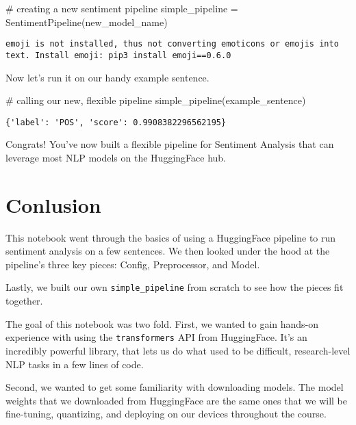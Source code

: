 \documentclass[
  letterpaper,
  DIV=11,
  numbers=noendperiod]{scrartcl}
\newenvironment{Shaded}{\begin{snugshade}}{\end{snugshade}}
\newcommand{\CommentTok}[1]{\textcolor[rgb]{0.37,0.37,0.37}{#1}}
\newcommand{\NormalTok}[1]{\textcolor[rgb]{0.00,0.23,0.31}{#1}}
\newcommand{\OperatorTok}[1]{\textcolor[rgb]{0.37,0.37,0.37}{#1}}
\begin{document}
\begin{Shaded}
\begin{Highlighting}[]
\CommentTok{\# creating a new sentiment pipeline}
\NormalTok{simple\_pipeline }\OperatorTok{=}\NormalTok{ SentimentPipeline(new\_model\_name)}
\end{Highlighting}
\end{Shaded}

\begin{verbatim}
emoji is not installed, thus not converting emoticons or emojis into text. Install emoji: pip3 install emoji==0.6.0
\end{verbatim}

Now let's run it on our handy example sentence.

\begin{Shaded}
\begin{Highlighting}[]
\CommentTok{\# calling our new, flexible pipeline}
\NormalTok{simple\_pipeline(example\_sentence)}
\end{Highlighting}
\end{Shaded}

\begin{verbatim}
{'label': 'POS', 'score': 0.9908382296562195}
\end{verbatim}

Congrats! You've now built a flexible pipeline for Sentiment Analysis
that can leverage most NLP models on the HuggingFace hub.

\section{Conlusion}\label{conlusion}

This notebook went through the basics of using a HuggingFace pipeline to
run sentiment analysis on a few sentences. We then looked under the hood
at the pipeline's three key pieces: Config, Preprocessor, and Model.

Lastly, we built our own \texttt{simple\_pipeline} from scratch to see
how the pieces fit together.

The goal of this notebook was two fold. First, we wanted to gain
hands-on experience with using the \texttt{transformers} API from
HuggingFace. It's an incredibly powerful library, that lets us do what
used to be difficult, research-level NLP tasks in a few lines of code.

Second, we wanted to get some familiarity with downloading models. The
model weights that we downloaded from HuggingFace are the same ones that
we will be fine-tuning, quantizing, and deploying on our devices
throughout the course.
\end{document}
